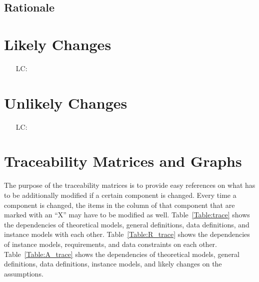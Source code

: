 \documentclass[12pt]{article}
\begin{document}
\subsection{Rationale}


\section{Likely Changes}    

\noindent \begin{itemize}

\item[LC\refstepcounter{lcnum}\thelcnum\label{LC_meaningfulLabel}:] 

\end{itemize}

\section{Unlikely Changes}    

\noindent \begin{itemize}

\item[LC\refstepcounter{lcnum}\thelcnum\label{LC_meaningfulLabel}:] 

\end{itemize}

\section{Traceability Matrices and Graphs}

The purpose of the traceability matrices is to provide easy references on what
has to be additionally modified if a certain component is changed.  Every time a
component is changed, the items in the column of that component that are marked
with an ``X'' may have to be modified as well.  Table~\ref{Table:trace} shows
the dependencies of theoretical models, general definitions, data definitions,
and instance models with each other. Table~\ref{Table:R_trace} shows the
dependencies of instance models, requirements, and data constraints on each
other. Table~\ref{Table:A_trace} shows the dependencies of theoretical models,
general definitions, data definitions, instance models, and likely changes on
the assumptions.
\end{document}

